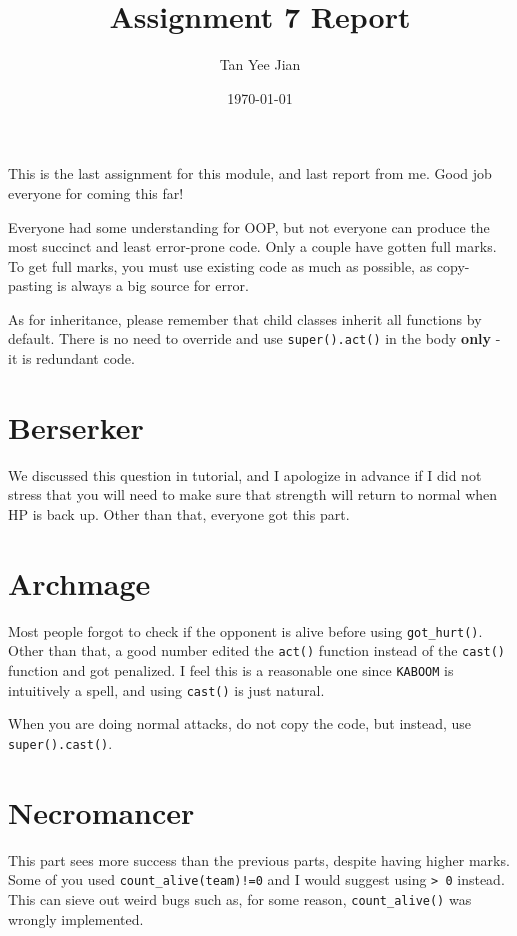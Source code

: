 \documentclass[11pt]{article}
\author{Tan Yee Jian}
\date{\today}
\title{Assignment 7 Report}
\begin{document}
\maketitle
\tableofcontents

This is the last assignment for this module, and last report from me. Good job
everyone for coming this far!

Everyone had some understanding for OOP, but not everyone can produce the most
succinct and least error-prone code. Only a couple have gotten full marks. To
get full marks, you must use existing code as much as possible, as copy-pasting
is always a big source for error.

As for inheritance, please remember that child classes inherit all functions by
default. There is no need to override and use \texttt{super().act()} in the body
\textbf{only} - it is redundant code.
\section{Berserker}
\label{sec:org2fa93b9}
We discussed this question in tutorial, and I apologize in advance if I did not
stress that you will need to make sure that strength will return to normal when
HP is back up. Other than that, everyone got this part.
\section{Archmage}
\label{sec:org4f3908c}
Most people forgot to check if the opponent is alive before using \texttt{got\_hurt()}.
Other than that, a good number edited the \texttt{act()} function instead of the
\texttt{cast()} function and got penalized. I feel this is a reasonable one since
\texttt{KABOOM} is intuitively a spell, and using \texttt{cast()} is just natural.

When you are doing normal attacks, do not copy the code, but instead, use
\texttt{super().cast()}.
\section{Necromancer}
\label{sec:orga4854e6}
This part sees more success than the previous parts, despite having higher
marks. Some of you used \texttt{count\_alive(team)!=0} and I would suggest using
\texttt{> 0} instead. This can sieve out weird bugs such as, for some reason,
\texttt{count\_alive()} was wrongly implemented.
\end{document}
